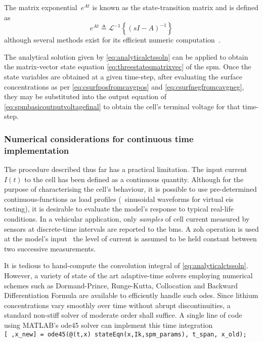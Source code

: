 The matrix exponential~$e^{At}$ is known as the state-transition matrix and is
defined as
\begin{equation}
    e^{A t} ≜ \mathcal{L}^{-1}\left\{(s I - A)^{-1}\right\}
\end{equation}
although several methods exist for its efficient numeric
computation~\cite{Moler2003}.

The analytical solution  given by \cref{eq:analyticalctssoln} can  be applied to
obtain the  matrix-vector state  equation \cref{eq:threestatesmatrixvec}  of the
\gls{spm}. Once  the state variables  are obtained  at a given  time-step, after
evaluating the  surface concentrations as per  \cref{eq:csurfposfromcavgpos} and
\cref{eq:csurfnegfromcavgneg}, they may be  substituted into the output equation
of \cref{eq:spmbasicoutputvoltagefinal}  to obtain  the cell's  terminal voltage
for that time-step.

\subsubsection*{Numerical considerations for continuous time implementation}

The  procedure  described  thus  far  has  a  practical  limitation.  The  input
current~$I(t)$ to the  cell has been defined as a  continuous quantity. Although
for the  purpose of characterising the  cell's behaviour, it is  possible to use
pre-determined continuous-functions  as load profiles  (\eg~sinusoidal waveforms
for virtual \gls{eis} testing), it is desirable to evaluate the model's response
to typical real-life conditions. In a vehicular application, only \emph{samples}
of cell current  measured by sensors at discrete-time intervals  are reported to
the \gls{bms}. A \gls{zoh} operation is  used at the model's input \ie~the level
of current is assumed to be held constant between two successive measurements.


It    is    tedious    to    hand-compute   the    convolution    integral    of
\cref{eq:analyticalctssoln}.   However,  a   variety   of  state   of  the   art
adaptive-time  solvers  employing  numerical  schemes  such  as  Dormand-Prince,
Runge-Kutta,  Collocation and  Backward  Differentiation  Formula are  available
to  efficiently  handle  such  \glspl{ode}. Since  lithium  concentrations  vary
smoothly  over  time  without   abrupt  discontinuities,  a  standard  non-stiff
solver  of  moderate   order  shall  suffice.  A  single  line   of  code  using
\textsc{MATLAB}'s  ode45  solver  can  implement this  time  integration  \eg~\\
\texttt{[~,x_new] =  ode45(@(t,x) stateEqn(x,Ik,spm_params), t_span,
x_old); }

